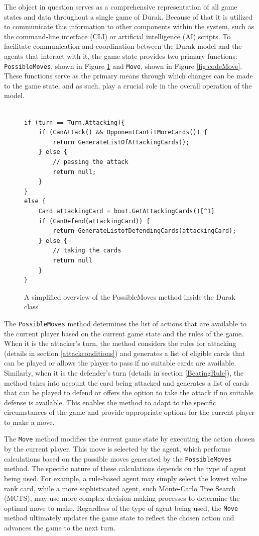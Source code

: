 The object in question serves as a comprehensive representation of all game states and data throughout a single game of Durak. Because of that it is utilized to communicate this information to other components within the system, such as the command-line interface (CLI) or artificial intelligence (AI) scripts. To facilitate communication and coordination between the Durak model and the agents that interact with it, the game state provides two primary functions: \texttt{PossibleMoves}, shown in Figure \ref{fig:codePossibleMoves} and \texttt{Move}, shown in Figure \ref{fig:codeMove}. These functions serve as the primary means through which changes can be made to the game state, and as such, play a crucial role in the overall operation of the model. 

\begin{figure}[h]
\captionsetup{justification=centering}
\lstset{basicstyle=\ttfamily\scriptsize}
\begin{lstlisting}

if (turn == Turn.Attacking){
	if (CanAttack() && OpponentCanFitMoreCards()) {
		return GenerateListOfAttackingCards();
	} else {
		// passing the attack
		return null;	
	}
}
else {
	Card attackingCard = bout.GetAttackingCards()[^1]
	if (CanDefend(attackingCard)) {
		return GenerateListofDefendingCards(attackingCard);
	} else {
		// taking the cards
		return null
	}
}
\end{lstlisting}
\caption{A simplified overview of the PossibleMoves method inside the Durak class}
\label{fig:codePossibleMoves}
\end{figure}

The \texttt{PossibleMoves} method determines the list of actions that are available to the current player based on the current game state and the rules of the game. When it is the attacker's turn, the method considers the rules for attacking (details in section \ref{attackconditions}) and generates a list of eligible cards that can be played or allows the player to pass if no suitable cards are available. Similarly, when it is the defender's turn (details in section \ref{BeatingRule}), the method takes into account the card being attacked and generates a list of cards that can be played to defend or offers the option to take the attack if no suitable defense is available. This enables the method to adapt to the specific circumstances of the game and provide appropriate options for the current player to make a move.

The \texttt{Move} method modifies the current game state by executing the action chosen by the current player. This move is selected by the agent, which performs calculations based on the possible moves generated by the \texttt{PossibleMoves} method. The specific nature of these calculations depends on the type of agent being used. For example, a rule-based agent may simply select the lowest value rank card, while a more sophisticated agent, such Monte-Carlo Tree Search (MCTS), may use more complex decision-making processes to determine the optimal move to make. Regardless of the type of agent being used, the \texttt{Move} method ultimately updates the game state to reflect the chosen action and advances the game to the next turn.

